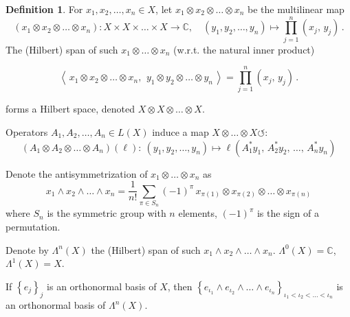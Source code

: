 \documentclass[a4paper, 10pt]{article}
\newcommand{\bbC}{\mathbb{C}}
\theoremstyle{definition}
\newtheorem{definition}{Definition}[section]
\theoremstyle{remark}
\theoremstyle{remark}
\begin{document}
\begin{definition}
    For $x_1, x_2, \ldots, x_n \in X$, let $x_1 \otimes x_2 \otimes \ldots \otimes x_n$ be the multilinear map 
    \begin{equation}
        (x_1 \otimes x_2 \otimes \ldots \otimes x_n) : X \times X \times \ldots \times X \to \bbC, \quad (y_1, y_2, \ldots, y_n) \mapsto \prod_{j=1}^{n} (x_j,\, y_j) \,. 
    \end{equation}
    The (Hilbert) span of such $x_1 \otimes \ldots \otimes x_n$ (w.r.t. the natural inner product) 

    \begin{equation}
        \left\langle\, x_1 \otimes x_2 \otimes \ldots \otimes x_n,\,\ y_1 \otimes y_2 \otimes \ldots \otimes y_n \,\right\rangle = \prod_{j=1}^{n} (x_j,\, y_j) \,. 
    \end{equation}
    
    forms a Hilbert space, denoted $X \otimes X \otimes \ldots \otimes X$.  

    Operators $A_1, A_2, \ldots, A_n \in L(X)$ induce a map $X \otimes \ldots \otimes X \circlearrowleft$: 
    \begin{equation}
        (A_1 \otimes A_2 \otimes \ldots \otimes A_n)(\ell) :\  (y_1, y_2, \ldots, y_n) \mapsto \ell (A_1^* y_1,\, A_2^* y_2,\, \ldots,\, A_n^* y_n)
    \end{equation}

    Denote the antisymmetrization of $x_1 \otimes \ldots \otimes x_n$ as 
    \begin{equation}
        x_1 \wedge x_2 \wedge \ldots \wedge x_n = \frac{1}{n !}  \sum_{\pi \in S_n} (-1)^\pi\, x_{\pi (1)} \otimes x_{\pi (2)} \otimes \ldots \otimes x_{\pi (n)} 
    \end{equation}
    where $S_n$ is the symmetric group with $n$ elements, $(-1)^\pi$ is the sign of a permutation. 

    Denote by $\Lambda^n (X)$ the (Hilbert) span of such $x_1 \wedge x_2 \wedge \ldots \wedge x_n$. $\Lambda^0 (X) = \bbC$, $\Lambda^1 (X) = X$. 
    
    If $\left\{ e_j \right\}_j$ is an orthonormal basis of $X$, then $\left\{ e_{\iota_1} \wedge e_{\iota_2} \wedge \ldots \wedge e_{\iota_n} \right\}_{\iota_1 < \iota_2 < \ldots < \iota_n}$ is an orthonormal basis of $\Lambda^n (X)$.
\end{definition}
\end{document}
